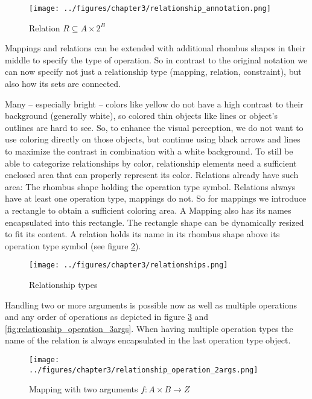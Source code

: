 \documentclass[twoside, openright, 12pt]{book}
\begin{document}
\begin{figure}[!htb]
	\centering
	\texttt{[image: ../figures/chapter3/relationship\_annotation.png]}
	\caption{Relation $R \subseteq A \times 2^B$}
	\label{fig:relationship_annotation}
\end{figure}

\noindent
Mappings and relations can be extended with additional rhombus shapes in their middle to specify the type of operation.
So in contrast to the original notation we can now specify not just a relationship type (mapping, relation, constraint), but also how its sets are connected.

Many -- especially bright -- colors like yellow do not have a high contrast to their background (generally white), so colored thin objects like lines or object's outlines are hard to see.
So, to enhance the visual perception, we do not want to use coloring directly on those objects, but continue using black arrows and lines to maximize the contrast in combination with a white background.
To still be able to categorize relationships by color, relationship elements need a sufficient enclosed area that can properly represent its color.
Relations already have such area: The rhombus shape holding the operation type symbol.
Relations always have at least one operation type, mappings do not.
So for mappings we introduce a rectangle to obtain a sufficient coloring area.
A Mapping also has its names encapsulated into this rectangle.
The rectangle shape can be dynamically resized to fit its content.
A relation holds its name in its rhombus shape above its operation type symbol (see figure \ref{fig:relationships}).

\begin{figure}[htb]
	\centering
	\texttt{[image: ../figures/chapter3/relationships.png]}
	\caption{Relationship types}
	\label{fig:relationships}
\end{figure}

\noindent
Handling two or more arguments is possible now as well as multiple operations and any order of operations as depicted in figure \ref{fig:relationship_operation_2args} and \ref{fig:relationship_operation_3args}.
When having multiple operation types the name of the relation is always encapsulated in the last operation type object.

\begin{figure}[!htb]
	\centering
	\texttt{[image: ../figures/chapter3/relationship\_operation\_2args.png]}
	\caption{Mapping with two arguments $f:A \times B \rightarrow Z$}
	\label{fig:relationship_operation_2args}
\end{figure}
\end{document}
